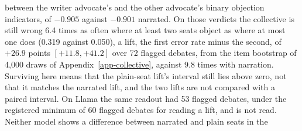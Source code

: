 between the writer advocate's and the other advocate's binary objection
indicators, of $-0.905$ against $-0.901$ narrated. On those verdicts the
collective is still wrong 6.4 times as often where at least two seats object
as where at most one does (0.319 against 0.050), a lift, the first error rate
minus the second, of $+26.9$ points $[+11.8, +41.2]$ over 72 flagged debates,
from the item bootstrap of 4,000 draws of
Appendix~\ref{app-collective}, against 9.8 times with narration. Surviving
here means that the plain-seat lift's interval still lies above zero, not
that it matches the narrated lift, and the two lifts are not compared with a
paired interval. On Llama the same readout had 53 flagged debates, under
the registered minimum of 60 flagged debates for reading a lift, and is not
read.
Neither model shows a difference between narrated and plain seats in the
